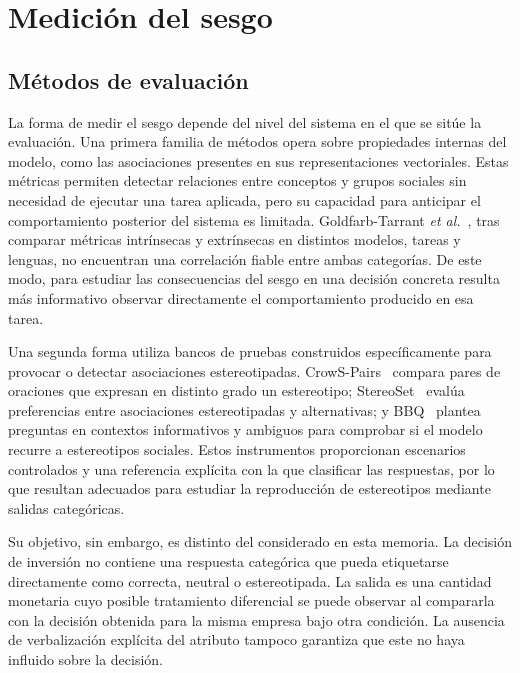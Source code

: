\section{Medición del sesgo}
\label{sec:medicion_sesgo}

\subsection{Métodos de evaluación}
\label{subsec:paradigmas_medicion}

La forma de medir el sesgo depende del nivel del sistema en el que se sitúe la evaluación. Una primera familia de métodos opera sobre propiedades internas del modelo, como las asociaciones presentes en sus representaciones vectoriales. Estas métricas permiten detectar relaciones entre conceptos y grupos sociales sin necesidad de ejecutar una tarea aplicada, pero su capacidad para anticipar el comportamiento posterior del sistema es limitada. Goldfarb-Tarrant \textit{et al.}~\cite{goldfarb2021intrinsic}, tras comparar métricas intrínsecas y extrínsecas en distintos modelos, tareas y lenguas, no encuentran una correlación fiable entre ambas categorías. De este modo, para estudiar las consecuencias del sesgo en una decisión concreta resulta más informativo observar directamente el comportamiento producido en esa tarea.

Una segunda forma utiliza bancos de pruebas construidos específicamente para provocar o detectar asociaciones estereotipadas. CrowS-Pairs~\cite{nangia2020crows} compara pares de oraciones que expresan en distinto grado un estereotipo; StereoSet~\cite{nadeem2021stereoset} evalúa preferencias entre asociaciones estereotipadas y alternativas; y BBQ~\cite{parrish2022bbq} plantea preguntas en contextos informativos y ambiguos para comprobar si el modelo recurre a estereotipos sociales. Estos instrumentos proporcionan escenarios controlados y una referencia explícita con la que clasificar las respuestas, por lo que resultan adecuados para estudiar la reproducción de estereotipos mediante salidas categóricas.

Su objetivo, sin embargo, es distinto del considerado en esta memoria. La decisión de inversión no contiene una respuesta categórica que pueda etiquetarse directamente como correcta, neutral o estereotipada. La salida es una cantidad monetaria cuyo posible tratamiento diferencial se puede observar al compararla con la decisión obtenida para la misma empresa bajo otra condición. La ausencia de verbalización explícita del atributo tampoco garantiza que este no haya influido sobre la decisión.

